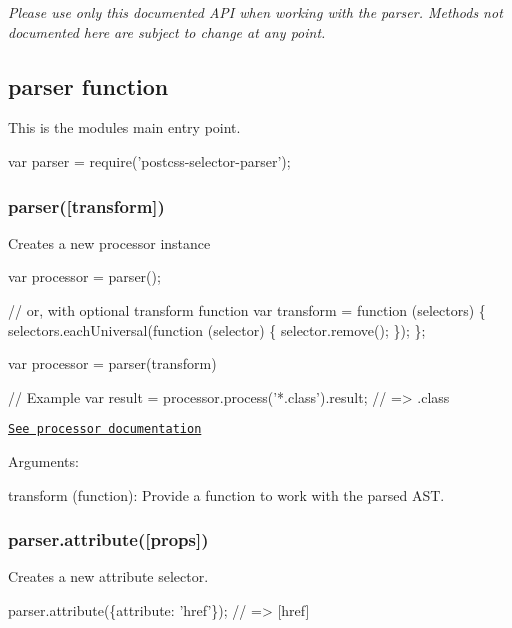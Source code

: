 {\itshape Please use only this documented A\+PI when working with the parser. Methods not documented here are subject to change at any point.}

\subsection*{{\ttfamily parser} function}

This is the module\textquotesingle{}s main entry point.


\begin{DoxyCode}
var parser = require('postcss-selector-parser');
\end{DoxyCode}


\subsubsection*{{\ttfamily parser(\mbox{[}transform\mbox{]})}}

Creates a new {\ttfamily processor} instance


\begin{DoxyCode}
var processor = parser();

// or, with optional transform function
var transform = function (selectors) \{
    selectors.eachUniversal(function (selector) \{
        selector.remove();
    \});
\};

var processor = parser(transform)

// Example
var result = processor.process('*.class').result;
// => .class
\end{DoxyCode}


\href{#processor}{\tt See processor documentation}

Arguments\+:


\begin{DoxyItemize}
\item {\ttfamily transform (function)}\+: Provide a function to work with the parsed A\+ST.
\end{DoxyItemize}

\subsubsection*{{\ttfamily parser.\+attribute(\mbox{[}props\mbox{]})}}

Creates a new attribute selector.


\begin{DoxyCode}
parser.attribute(\{attribute: 'href'\});
// => [href]
\end{DoxyCode}


